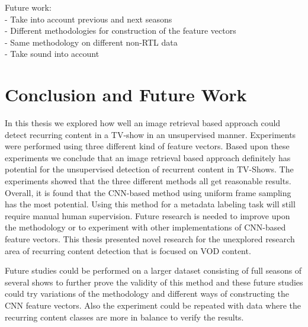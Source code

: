 \documentclass{report}
\begin{document}
Future work: \\
- Take into account previous and next seasons\\
- Different methodologies for construction of the feature vectors\\
- Same methodology on different non-RTL data\\
- Take sound into account
\fi


\chapter{Conclusion and Future Work} \label{conclusion}
In this thesis we explored how well an image retrieval based approach could detect recurring content in a TV-show in an unsupervised manner. Experiments were performed using three different kind of feature vectors. Based upon these experiments we conclude that an image retrieval based approach definitely has potential for the unsupervised detection of recurrent content in TV-Shows. The experiments showed that the three different methods all get reasonable results. Overall, it is found that the CNN-based method using uniform frame sampling has the most potential. Using this method for a metadata labeling task will still require manual human supervision. Future research is needed to improve upon the methodology or to experiment with other implementations of CNN-based feature vectors. This thesis presented novel research for the unexplored research area of recurring content detection that is focused on VOD content.

Future studies could be performed on a larger dataset consisting of full seasons of several shows to further prove the validity of this method and these future studies could try variations of the methodology and different ways of constructing the CNN feature vectors. Also the experiment could be repeated with data where the recurring content classes are more in balance to verify the results.

\end{document}
